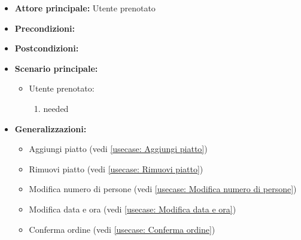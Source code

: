 \label{usecase:Modifica ordine}
\begin{itemize}
\item \textbf{Attore principale:}  Utente prenotato
\item \textbf{Precondizioni:}
\item \textbf{Postcondizioni:}
\item \textbf{Scenario principale:}
\begin{itemize}
\item  Utente prenotato:
\begin{enumerate}
\item needed
\end{enumerate}
\end{itemize}
\item \textbf{Generalizzazioni:}
\begin{itemize}
\item  Aggiungi piatto (vedi \autoref{usecase: Aggiungi piatto})
\item  Rimuovi piatto (vedi \autoref{usecase: Rimuovi piatto})
\item  Modifica numero di persone (vedi \autoref{usecase: Modifica numero di persone})
\item  Modifica data e ora (vedi \autoref{usecase: Modifica data e ora})
\item  Conferma ordine (vedi \autoref{usecase: Conferma ordine})
\end{itemize}
\end{itemize}